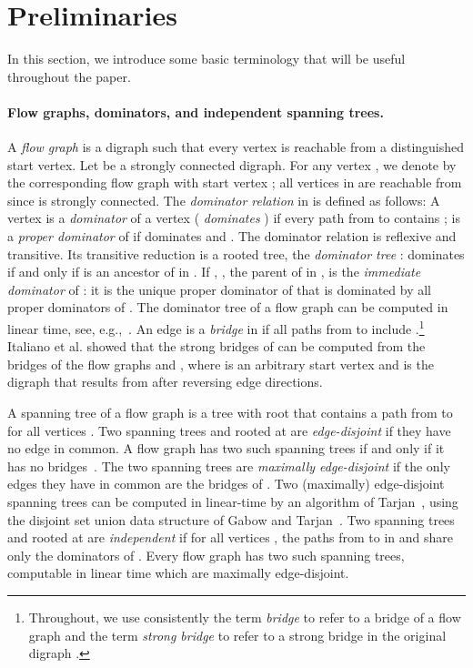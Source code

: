 \documentclass[11pt]{article}
\begin{document}
\section{Preliminaries}
\label{sec:dominators}



In this section, we introduce some basic terminology that will be useful throughout the paper.

\paragraph{Flow graphs, dominators, and independent spanning trees.}
A \emph{flow graph} is a digraph such that every vertex
is reachable from a distinguished start vertex. Let  be a
strongly connected digraph. For any vertex , we denote by
 the corresponding flow graph with start vertex ;
all vertices in  are reachable from  since  is strongly
connected. The \emph{dominator relation} in  is defined as
follows: A vertex  is a \emph{dominator} of a vertex  (
\emph{dominates} ) if every path from  to  contains ;
 is a \emph{proper dominator} of  if  dominates  and
.  The dominator relation is reflexive and transitive.
Its transitive reduction is a rooted tree, the \emph{dominator
tree} :  dominates  if and only if  is an ancestor
of  in . If , , the parent of  in
, is the \emph{immediate dominator} of : it is the unique
proper dominator of  that is dominated by all proper dominators
of . The dominator tree of a flow graph can be computed in
linear time, see, e.g.,~\cite{domin:ahlt,dominators:bgkrtw}. An
edge  is a \emph{bridge} in  if all paths from  to
 include .\footnote{Throughout,
we use consistently the term  \emph{bridge} to refer to a bridge of a flow graph  and the term \emph{strong bridge} to refer to a strong bridge in the original digraph .}
Italiano et al. \cite{Italiano2012} showed that
the strong bridges of 
can be computed from the bridges of the flow graphs  and , where  is an arbitrary start vertex and  is the digraph that results from  after reversing edge directions.

A spanning tree  of a flow graph  is a tree with root  that contains a path from  to  for all vertices .
Two spanning trees  and  rooted at  are \emph{edge-disjoint} if they have no edge in common. A flow graph  has two such spanning trees if and only if it has no bridges~\cite{st:t}. The two spanning trees are \emph{maximally edge-disjoint} if the only edges they have in common are the bridges of . Two (maximally) edge-disjoint spanning trees can be computed in linear-time by an algorithm of Tarjan~\cite{st:t}, using the disjoint set union data structure of Gabow and Tarjan~\cite{dsu:gt}.
Two spanning trees  and  rooted at  are \emph{independent} if for all vertices , the paths from  to  in  and  share only the dominators of . Every flow graph  has two such spanning trees, computable in linear time \cite{domv:gt05,domcert} which are maximally edge-disjoint.
\end{document}
